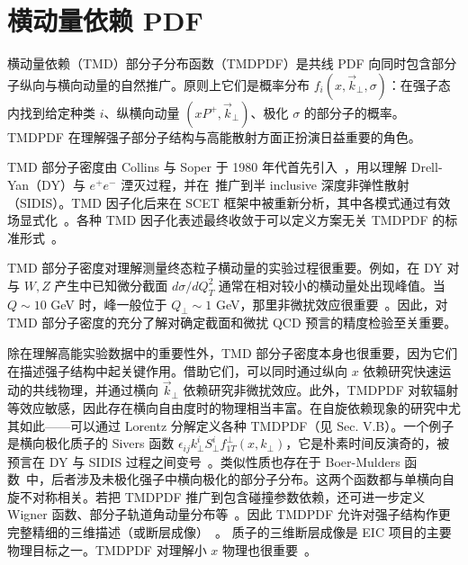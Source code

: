 \section{横动量依赖 PDF}
\label{sec:tmd}
横动量依赖（TMD）部分子分布函数（TMDPDF）是共线 PDF 向同时包含部分子纵向与横向动量的自然推广。原则上它们是概率分布 $f_i(x,\vec{k}_\perp,\sigma)$：在强子态内找到给定种类 $i$、纵横向动量 $(xP^+,\vec{k}_{\perp})$、极化 $\sigma$ 的部分子的概率。TMDPDF 在理解强子部分子结构与高能散射方面正扮演日益重要的角色。

TMD 部分子密度由 Collins 与 Soper 于 1980 年代首先引入~\cite{Collins:1981uk,Collins:1981va,Collins:1982wa,Collins:1984kg,Collins:1985ue,Bodwin:1984hc}，用以理解 Drell-Yan（DY）与 $e^{+}e^{-}$ 湮灭过程，并在~\cite{Ji:2004wu,Ji:2004xq}推广到半 inclusive 深度非弹性散射（SIDIS）。TMD 因子化后来在 SCET 框架中被重新分析，其中各模式通过有效场显式化~\cite{Bauer:2000yr,Bauer:2001yt,Manohar:2006nz,Becher:2010tm,GarciaEchevarria:2011rb,Echevarria:2012js,Chiu:2012ir}。各种 TMD 因子化表述最终收敛于可以定义方案无关 TMDPDF 的标准形式~\cite{Echevarria:2012js,Collins:2012uy,Collins:2017oxh}。

TMD 部分子密度对理解测量终态粒子横动量的实验过程很重要。例如，在 DY 对与 $W, Z$ 产生中已知微分截面 $d\sigma/dQ_T^2$ 通常在相对较小的横动量处出现峰值。当 $Q\sim 10 $ GeV 时，峰一般位于 $Q_\perp\sim 1 $ GeV，那里非微扰效应很重要~\cite{Collins:1984kg}。因此，对 TMD 部分子密度的充分了解对确定截面和微扰 QCD 预言的精度检验至关重要。

除在理解高能实验数据中的重要性外，TMD 部分子密度本身也很重要，因为它们在描述强子结构中起关键作用。借助它们，可以同时通过纵向 $x$ 依赖研究快速运动的共线物理，并通过横向 $\vec{k}_\perp$ 依赖研究非微扰效应。此外，TMDPDF 对软辐射等效应敏感，因此存在横向自由度时的物理相当丰富。在自旋依赖现象的研究中尤其如此——可以通过 Lorentz 分解定义各种 TMDPDF（见 Sec. V.B）。一个例子是横向极化质子的 Sivers 函数 $\epsilon_{ij}k^i_\perp S^i_\perp f^{\perp}_{1T}(x,k_\perp)$，它是朴素时间反演奇的，被预言在 DY 与 SIDIS 过程之间变号~\cite{Collins:2011zzd}。类似性质也存在于 Boer-Mulders 函数~\cite{Boer:1997nt}中，后者涉及未极化强子中横向极化的部分子分布。这两个函数都与单横向自旋不对称相关。若把 TMDPDF 推广到包含碰撞参数依赖，还可进一步定义 Wigner 函数、部分子轨道角动量分布等~\cite{Belitsky:2003nz, Lorce:2011ni}。因此 TMDPDF 允许对强子结构作更完整精细的三维描述（或断层成像）~\cite{Burkardt:2000za, Boer:2011fh}。
质子的三维断层成像是 EIC 项目的主要物理目标之一。TMDPDF 对理解小 $x$ 物理也很重要~\cite{Kuraev:1977fs,Balitsky:1978ic,Balitsky:1995ub,Kovchegov:1999yj,Kovchegov:2012mbw}。

